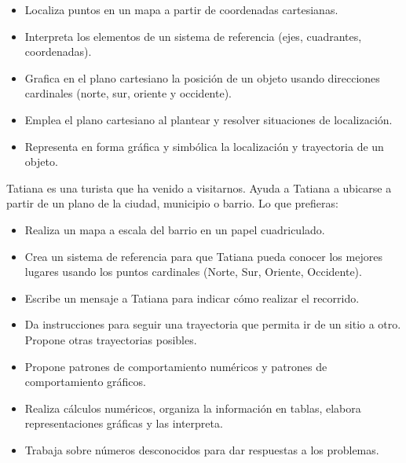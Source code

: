 
\evidencias

\begin{itemize}
  \item Localiza puntos en un mapa a partir de coordenadas cartesianas.
  \item Interpreta los elementos de un sistema de referencia (ejes, cuadrantes, coordenadas).
  \item Grafica en el plano cartesiano la posición de un objeto usando direcciones cardinales (norte, sur, oriente y occidente).
  \item Emplea el plano cartesiano al plantear y resolver situaciones de localización.
  \item Representa en forma gráfica y simbólica la localización y trayectoria de un objeto.
\end{itemize}

\ejemplo


Tatiana es una turista que ha venido a visitarnos. Ayuda a Tatiana a ubicarse a partir de un plano de la ciudad, municipio o barrio. Lo que prefieras:

\begin{itemize}
  \item Realiza un mapa a escala del barrio en un papel cuadriculado.
  \item Crea un sistema de referencia para que Tatiana pueda conocer los mejores lugares usando los puntos cardinales (Norte, Sur, Oriente, Occidente).
  \item Escribe un mensaje a Tatiana para indicar cómo realizar el recorrido.
  \item Da instrucciones para seguir una trayectoria que permita ir de un sitio a otro. Propone otras trayectorias posibles.
\end{itemize}


\evidencias

\begin{itemize}
  \item Propone patrones de comportamiento numéricos y patrones de comportamiento gráficos.
  \item Realiza cálculos numéricos, organiza la información en tablas, elabora representaciones gráficas y las interpreta.
  \item Trabaja sobre números desconocidos para dar respuestas a los problemas.
\end{itemize}

